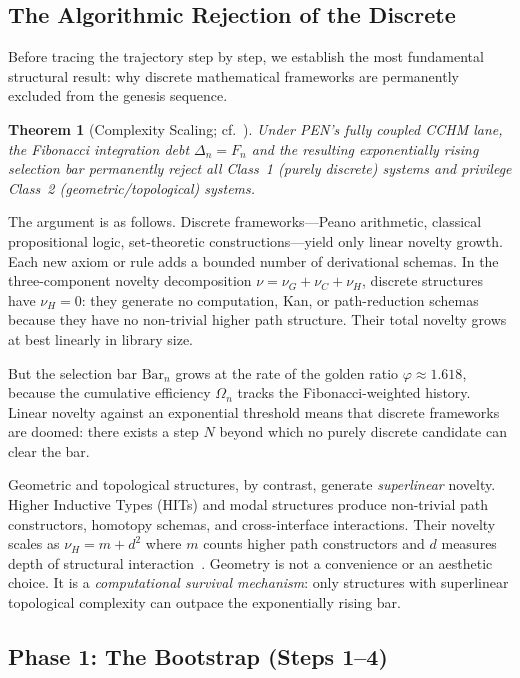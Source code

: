 \documentclass[11pt,a4paper]{article}
\theoremstyle{plain}
\newtheorem{theorem}{Theorem}[section]
\theoremstyle{definition}
\theoremstyle{remark}
\begin{document}
\subsection{The Algorithmic Rejection of the Discrete}
\label{sec:discrete-rejection}

Before tracing the trajectory step by step, we establish the most fundamental structural result: why discrete mathematical frameworks are permanently excluded from the genesis sequence.

\begin{theorem}[Complexity Scaling; cf.\ \cite{pen2026}]
\label{thm:scaling}
Under PEN's fully coupled CCHM lane, the Fibonacci integration debt $\Delta_n = F_n$ and the resulting exponentially rising selection bar permanently reject all Class~1 (purely discrete) systems and privilege Class~2 (geometric/topological) systems.
\end{theorem}

The argument is as follows.  Discrete frameworks---Peano arithmetic, classical propositional logic, set-theoretic constructions---yield only linear novelty growth.  Each new axiom or rule adds a bounded number of derivational schemas.  In the three-component novelty decomposition $\nu = \nu_G + \nu_C + \nu_H$, discrete structures have $\nu_H = 0$: they generate no computation, Kan, or path-reduction schemas because they have no non-trivial higher path structure.  Their total novelty grows at best linearly in library size.

But the selection bar $\mathrm{Bar}_n$ grows at the rate of the golden ratio $\varphi \approx 1.618$, because the cumulative efficiency $\Omega_n$ tracks the Fibonacci-weighted history.  Linear novelty against an exponential threshold means that discrete frameworks are doomed: there exists a step $N$ beyond which no purely discrete candidate can clear the bar.

Geometric and topological structures, by contrast, generate \emph{superlinear} novelty.  Higher Inductive Types (HITs) and modal structures produce non-trivial path constructors, homotopy schemas, and cross-interface interactions.  Their novelty scales as $\nu_H = m + d^2$ where $m$ counts higher path constructors and $d$ measures depth of structural interaction~\cite{pen2026}.  Geometry is not a convenience or an aesthetic choice.  It is a \emph{computational survival mechanism}: only structures with superlinear topological complexity can outpace the exponentially rising bar.


\subsection{Phase 1: The Bootstrap (Steps 1--4)}
\label{sec:bootstrap}
\end{document}
